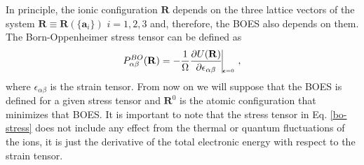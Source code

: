 In principle, the ionic configuration $\mathbf{R}$ depends on the three lattice vectors of the system $\mathbf{R}\equiv\mathbf{R}(\{\mathbf{a}_{i}\})$ $i=1,2,3$ and, therefore, the BOES also depends on them. The Born-Oppenheimer stress 
tensor can be defined as
\begin{equation}
\label{bo-stress}
 P_{\alpha\beta}^{BO}(\mathbf{R})=-\frac{1}{\Omega}\frac{\partial U(\mathbf{R})}{\partial\epsilon_{\alpha\beta}}\vline_{_{_{_{_{_{_{_{\boldsymbol{\epsilon}=0}}}}}}}},
\end{equation} 
where $\epsilon_{\alpha\beta}$ is the strain tensor. From now on we will suppose that the BOES is defined for a given stress tensor and $\mathbf{R}^{0}$ is the atomic configuration that minimizes that BOES. It is important to note 
that the stress tensor in Eq. \ref{bo-stress} does not include any effect from the thermal or quantum fluctuations of the ions, it is just the derivative of the total electronic energy with respect to the strain tensor. \\
 
